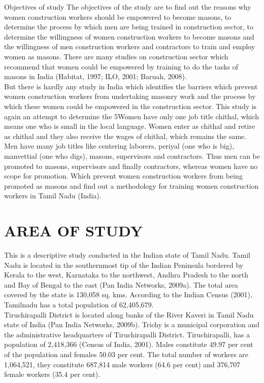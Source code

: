 \documentclass[12pt]{report}
\begin{document}
	Objectives  of  study The  objectives  of  the  study  are  to  find  out  the  reasons  why  women  construction workers  should  be  empowered  to  become  masons,  to  determine  the  process  by  which men  are  being  trained  in  construction  sector,  to  determine  the  willingness  of  women construction  workers  to  become  masons  and  the  willingness  of  men  construction  workers and  contractors  to  train  and  employ  women  as  masons.  There  are  many  studies  on construction  sector  which  recommend  that  women  could  be  empowered  by  training  to  do the  tasks  of  masons  in  India  (Habitat,  1997;  ILO,  2001;  Baruah,  2008).\\
	
	But  there  is hardly  any  study  in  India  which  identifies  the  barriers  which  prevent  women  construction workers  from  undertaking  masonry  work  and  the  process  by  which  these  women  could  be empowered  in  the  construction  sector.  This  study  is  again  an  attempt  to  determine  the 5Women have  only  one  job  title  chithal,  which  means  one  who  is  small  in  the  local  language.  Women  enter as  chithal  and  retire  as  chithal  and  they  also  receive  the  wages  of  chithal,  which  remains  the  same.  Men have  many  job  titles  like  centering  laborers,  periyal  (one  who  is  big),  manvettial  (one  who  digs),  masons, supervisors  and  contractors.  Thus  men  can  be  promoted  to  masons, supervisors  and  finally  contractors,  whereas  women  have  no  scope  for  promotion. Which  prevent  women  construction  workers  from  being  promoted  as  masons  and find  out  a  methodology  for  training  women  construction  workers  in  Tamil  Nadu  (India). 
	
	
	\section{AREA OF STUDY}
	This  is  a  descriptive  study  conducted  in  the  Indian  state  of  Tamil Nadu.  Tamil Nadu  is  located  in  the  southernmost  tip  of  the  Indian  Peninsula  bordered  by  Kerala  to  the west,  Karnataka  to  the  northwest,  Andhra  Pradesh  to  the  north  and  Bay  of  Bengal  to  the east  (Pan  India  Networks,  2009a).  The  total  area  covered  by  the  state  is  130,058  sq.  kms. According  to  the  Indian  Census  (2001),  Tamilnadu  has  a  total  population  of  62,405,679.\\
	
	Tiruchirapalli  District  is  located  along  banks  of  the  River  Kaveri  in  Tamil  Nadu  state  of India  (Pan  India  Networks,  2009b).  Trichy  is  a  municipal  corporation  and  the administrative  headquarters  of  Tiruchirapalli  District.  Tiruchirapalli,  has  a  population  of 2,418,366  (Census  of  India,  2001).  Males  constitute  49.97  per  cent  of  the  population  and females  50.03  per  cent.  The  total  number  of  workers  are  1,064,521,  they  constitute 687,814  male  workers  (64.6  per  cent)  and  376,707  female  workers  (35.4  per  cent). 
	
\end{document}
